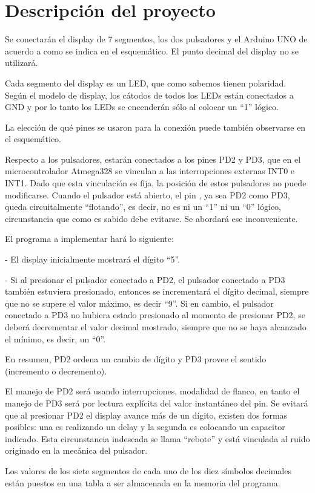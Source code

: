 \section{Descripción del proyecto}\label{sec:intro}
\par Se conectarán el display de 7 segmentos, los dos pulsadores y el Arduino UNO de acuerdo a como se indica en el esquemático. El punto decimal del display no se utilizará.

\par Cada segmento del display es un LED, que como sabemos tienen polaridad. Según el modelo de display, los cátodos de todos los LEDs están conectados a GND y por lo tanto los LEDs se encenderán sólo al colocar un “1” lógico.
\par La elección de qué pines se usaron para la conexión puede también observarse en el esquemático.
\par Respecto a los pulsadores, estarán conectados a los pines PD2 y PD3, que en el microcontrolador Atmega328 se vinculan a las interrupciones externas INT0 e INT1.
Dado que esta vinculación es fija, la posición de estos pulsadores no puede modificarse. Cuando el pulsador está abierto, el pin , ya sea PD2 como PD3, queda circuitalmente “flotando”, es decir, no es ni un “1” ni un “0” lógico, circunstancia que como es sabido debe evitarse. Se abordará ese inconveniente.
\par El programa a implementar hará lo siguiente:
 \par - El display inicialmente mostrará el dígito “5”.
\par - Si al presionar el pulsador conectado a PD2, el pulsador conectado a PD3 también estuviera presionado, entonces se incrementará el dígito decimal, siempre que no se supere el valor máximo, es decir “9”. Si en cambio, el pulsador conectado a PD3 no hubiera estado presionado al momento de presionar PD2, se deberá decrementar el valor decimal mostrado, siempre que no se haya alcanzado el mínimo, es decir, un “0”.
\par En resumen, PD2 ordena un cambio de dígito y PD3 provee el sentido (incremento o decremento).
\par  El manejo de PD2 será usando interrupciones, modalidad de flanco, en tanto el manejo de PD3 será por lectura explícita del valor instantáneo del pin.
Se evitará que al presionar PD2 el display avance más de un dígito, existen dos formas posibles: una es realizando un delay y la segunda es colocando un capacitor indicado. Esta circunstancia indeseada se llama “rebote” y está vinculada al ruido originado en la mecánica del pulsador.
\par Los valores de los siete segmentos de cada uno de los diez símbolos decimales están puestos en una tabla a ser almacenada en la memoria del programa.